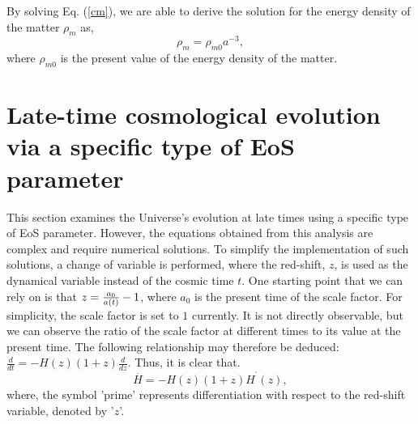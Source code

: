 \documentclass[prd,superscriptaddress,amsfonts,amssymb,amsmath,showpacs,twocolumn]{revtex4-2}
\begin{document}
By solving Eq. (\ref{cm}), we are able to derive the solution for the energy density of the matter $\rho_{m}$ as,%
\begin{equation}
\rho _{m}=\rho _{m0}a^{-3},
\end{equation}%
where $\rho_{m0}$ is the present value of the energy density of the matter.

\section{Late-time cosmological evolution via a specific type of EoS
parameter}
\label{sec3}

This section examines the Universe's evolution at late times using a
specific type of EoS parameter. However, the equations obtained from this
analysis are complex and require numerical solutions. To simplify the
implementation of such solutions, a change of variable is performed, where
the red-shift, $z$, is used as the dynamical variable instead of the cosmic
time $t$. One starting point that we can rely on is that $z=\frac{a_{0}}{%
a\left( t\right) }-1$, where $a_{0}$ is the present time of the scale factor. For simplicity, the scale factor is set to $1$ currently. It is not directly observable, but we can observe the ratio of the scale factor at different times to its value at the present time. The following
relationship may therefore be deduced: $\frac{d}{dt}=-H\left( z\right)
\left( 1+z\right) \frac{d}{dz}$. Thus, it is clear that.%
\begin{equation}
\overset{.}{H}=-H\left( z\right) \left( 1+z\right) H^{^{\prime }}\left(
z\right) ,
\end{equation}%
where, the symbol 'prime' represents differentiation with respect to the
red-shift variable, denoted by '$z$'.
\end{document}
